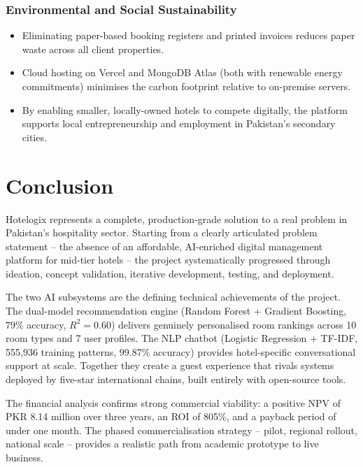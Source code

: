 \documentclass[12pt,a4paper]{report}
\begin{document}
\subsection*{Environmental and Social Sustainability}
\begin{itemize}[leftmargin=*, label=\textbullet]
  \item Eliminating paper-based booking registers and printed invoices reduces paper waste across all client properties.
  \item Cloud hosting on Vercel and MongoDB Atlas (both with renewable energy commitments) minimises the carbon footprint relative to on-premise servers.
  \item By enabling smaller, locally-owned hotels to compete digitally, the platform supports local entrepreneurship and employment in Pakistan's secondary cities.
\end{itemize}

\chapter*{Conclusion}

Hotelogix represents a complete, production-grade solution to a real problem in Pakistan's hospitality sector. Starting from a clearly articulated problem statement -- the absence of an affordable, AI-enriched digital management platform for mid-tier hotels -- the project systematically progressed through ideation, concept validation, iterative development, testing, and deployment.

The two AI subsystems are the defining technical achievements of the project. The dual-model recommendation engine (Random Forest + Gradient Boosting, 79\% accuracy, $R^2 = 0.60$) delivers genuinely personalised room rankings across 10 room types and 7 user profiles. The NLP chatbot (Logistic Regression + TF-IDF, 555,936 training patterns, 99.87\% accuracy) provides hotel-specific conversational support at scale. Together they create a guest experience that rivals systems deployed by five-star international chains, built entirely with open-source tools.

The financial analysis confirms strong commercial viability: a positive NPV of PKR 8.14 million over three years, an ROI of 805\%, and a payback period of under one month. The phased commercialisation strategy -- pilot, regional rollout, national scale -- provides a realistic path from academic prototype to live business.
\end{document}
